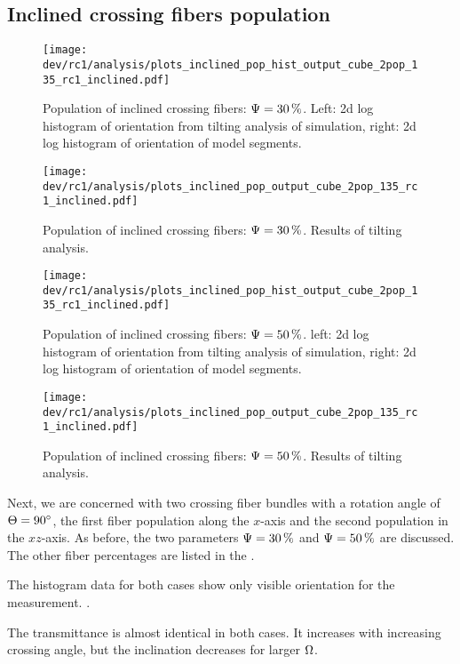 \subsection{Inclined crossing fibers population}
\label{sec:resInclCross}
%
\begin{figure}[!t]
\centering
\texttt{[image: dev/rc1/analysis/plots\_inclined\_pop\_hist\_output\_cube\_2pop\_135\_rc1\_inclined.pdf]}
\caption{Population of inclined crossing fibers: $\textnormal{$\Psi$}=\SI{30}{\percent}$. Left: 2d log histogram of orientation from tilting analysis of simulation, right: 2d log histogram of orientation of model segments.}
\label{fig:inclined_03_fiber_pop_hist}
\end{figure}
%
\begin{figure}[!p]
\centering
\texttt{[image: dev/rc1/analysis/plots\_inclined\_pop\_output\_cube\_2pop\_135\_rc1\_inclined.pdf]}
\caption{Population of inclined crossing fibers: $\textnormal{$\Psi$}=\SI{30}{\percent}$. Results of tilting analysis.}
\label{fig:inclined_03_fiber_pop_rofl}
\end{figure}
%
\begin{figure}[!t]
\centering
\texttt{[image: dev/rc1/analysis/plots\_inclined\_pop\_hist\_output\_cube\_2pop\_135\_rc1\_inclined.pdf]}
\caption{Population of inclined crossing fibers: $\textnormal{$\Psi$}=\SI{50}{\percent}$. left: 2d log histogram of orientation from tilting analysis of simulation, right: 2d log histogram of orientation of model segments.}
\label{fig:inclined_05_fiber_pop_hist}
\end{figure}
%
\begin{figure}[!p]
\centering
\texttt{[image: dev/rc1/analysis/plots\_inclined\_pop\_output\_cube\_2pop\_135\_rc1\_inclined.pdf]}
\caption{Population of inclined crossing fibers: $\textnormal{$\Psi$}=\SI{50}{\percent}$. Results of tilting analysis.}
\label{fig:inclined_05_fiber_pop_rofl}
\end{figure}
%
Next, we are concerned with two crossing fiber bundles with a rotation angle of $\textnormal{$\Theta$} = \SI{90}{\degree}$, \ie{} the first fiber population along the $x$-axis and the second population in the $xz$-axis.
As before, the two parameters $\textnormal{$\Psi$} = \SI{30}{\percent}$ and $\textnormal{$\Psi$} = \SI{50}{\percent}$ are discussed.
The other fiber percentages are listed in the .
\par
%
The histogram data for both cases show only visible orientation for the measurement.
\dummy{}.
\par
The transmittance is almost identical in both cases.
It increases with increasing crossing angle, but the inclination decreases for larger $\textnormal{$\Omega$}$.
